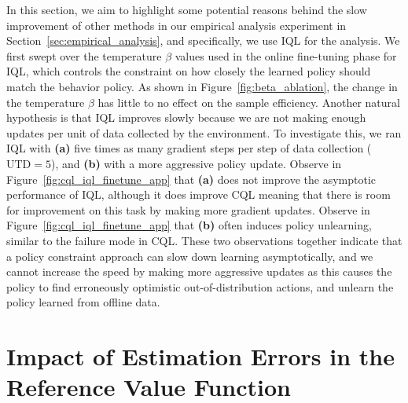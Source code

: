 In this section, we aim to highlight some potential reasons behind the slow improvement of other methods in our empirical analysis experiment in Section~\ref{sec:empirical_analysis}, and specifically, we use IQL for the analysis. We first swept over the temperature $\beta$ values used in the online fine-tuning phase for IQL, which controls the constraint on how closely the learned policy should match the behavior policy. As shown in Figure~\ref{fig:beta_ablation}, the change in the temperature $\beta$ has little to no effect on the sample efficiency. Another natural hypothesis is that IQL improves slowly because we are not making enough updates per unit of data collected by the environment. To investigate this, we ran IQL with \textbf{(a)} five times as many gradient steps per step of data collection ($\text{UTD}=5$), and \textbf{(b)} with a more aggressive policy update. Observe in Figure~\ref{fig:cql_iql_finetune_app} that \textbf{(a)} does not improve the asymptotic performance of IQL, although it does improve CQL meaning that there is room for improvement on this task by making more gradient updates. Observe in Figure~\ref{fig:cql_iql_finetune_app} that \textbf{(b)} often induces policy unlearning, similar to the failure mode in CQL. These two observations together indicate that a policy constraint approach can slow down learning asymptotically, and we cannot increase the speed by making more aggressive updates as this causes the policy to find erroneously optimistic out-of-distribution actions, and unlearn the policy learned from offline data. 


\section{Impact of Estimation Errors in the Reference Value Function}
\label{app:nn_value_function}

